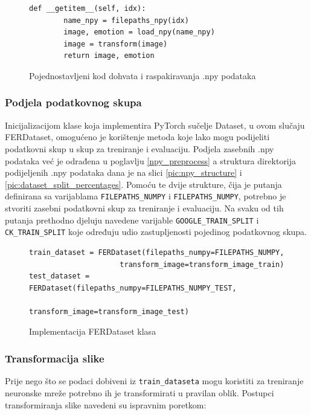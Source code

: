 \documentclass[times, utf8, zavrsni,numeric,pstricks]{fer}
\begin{document}
\begin{figure}[H]
\centering
\begin{Verbatim}[fontsize=\small]
def __getitem__(self, idx):
        name_npy = filepaths_npy(idx)
        image, emotion = load_npy(name_npy)
        image = transform(image)
        return image, emotion
\end{Verbatim}
\caption{Pojednostavljeni kod dohvata i raspakiravanja .npy podataka}
\label{pic:init_dataset}
\end{figure}

\subsubsection{Podjela podatkovnog skupa}
Inicijalizacijom klase koja implementira PyTorch sučelje Dataset, u ovom slučaju FERDataset, omogućeno je korištenje metoda koje lako mogu podijeliti podatkovni skup u skup za treniranje i evaluaciju. Podjela zasebnih .npy podataka već je odrađena u poglavlju \ref{npy_preprocess} a struktura direktorija podijeljenih .npy podataka dana je na slici \ref{pic:npy_structure} i \ref{pic:dataset_split_percentages}. Pomoću te dvije strukture, čija je putanja definirana sa varijablama \lstinline"FILEPATHS_NUMPY" i \lstinline"FILEPATHS_NUMPY", potrebno je stvoriti zasebni podatkovni skup za treniranje i evaluaciju. Na svaku od tih putanja prethodno djeluju navedene varijable \lstinline"GOOGLE_TRAIN_SPLIT" i \lstinline"CK_TRAIN_SPLIT" koje određuju udio zastupljenosti pojedinog podatkovnog skupa.

\begin{figure}[H]
\centering
\begin{Verbatim}[fontsize=\small]
train_dataset = FERDataset(filepaths_numpy=FILEPATHS_NUMPY,
                     transform_image=transform_image_train)
test_dataset = FERDataset(filepaths_numpy=FILEPATHS_NUMPY_TEST,
                          transform_image=transform_image_test)
\end{Verbatim}
\caption{Implementacija FERDataset klasa}
\label{pic:init_dataset}
\end{figure}

\subsubsection{Transformacija slike}\label{transform_image}

Prije nego što se podaci dobiveni iz \lstinline"train_dataseta" mogu koristiti za treniranje neuronske mreže potrebno ih je transformirati u pravilan oblik. Postupci transformiranja slike navedeni su ispravnim poretkom: 
\end{document}

